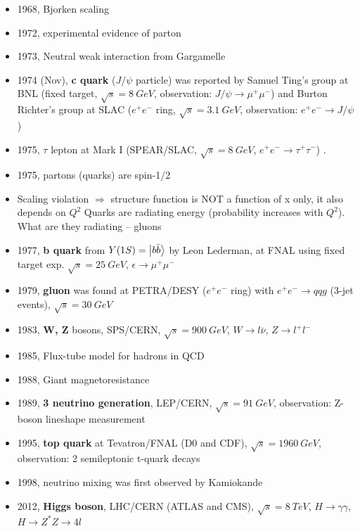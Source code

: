\begin{itemize}
    \item 1968, Bjorken scaling \cite{PhysRev.179.1547}
    \item 1972, experimental evidence of parton \cite{PhysRevD.5.528}
    \item 1973, Neutral weak interaction from Gargamelle \cite{HASERT19741}
    \item 1974 (Nov), \textbf{c quark} ($J/\psi$ particle) was reported by 
	Samuel Ting's group at BNL (fixed target, $\sqrt{s} = 8\ GeV$, 
	observation: $J/\psi \rightarrow \mu^+\mu^-$) 
	and Burton Richter's group at SLAC ($e^+e^-$ ring, $\sqrt{s} = 3.1\ GeV$, 
	observation: $e^+e^- \rightarrow J/\psi$)
    \item 1975, $\tau$ lepton at Mark I (SPEAR/SLAC, $\sqrt{s} = 8 \ GeV$, 
	$e^+e^- \rightarrow \tau^+\tau^-$) \cite{PhysRevLett.35.1489}.
    \item 1975, partons (quarks) are spin-1/2 \cite{PhysRevLett.35.1609}
    \item Scaling violation $\Rightarrow$ structure function is NOT a function 
	of x only, it also depends on $Q^2$
	Quarks are radiating energy (probability increases with $Q^2$). What
	are they radiating -- gluons
    \item 1977, \textbf{b quark} from $Y(1S) = \ket{b\bar{b}}$ by Leon Lederman, 
	at FNAL using fixed target exp.
	$\sqrt{s} = 25 \ GeV$, $\epsilon \rightarrow \mu^+\mu^-$
    \item 1979, \textbf{gluon} was found at PETRA/DESY ($e^+e^-$ ring) with 
	$e^+e^- \rightarrow qqg$ (3-jet events), $\sqrt{s} = 30\ GeV$
    \item 1983, \textbf{W, Z} bosons, SPS/CERN, $\sqrt{s} = 900\ GeV$, $W \rightarrow l\bar{\nu}$,
	$Z \rightarrow l^+l^-$
    \item 1985, Flux-tube model for hadrons in QCD \cite{PhysRevD.31.2910}
    \item 1988, Giant magnetoresistance
    \item 1989, \textbf{3 neutrino generation}, LEP/CERN, $\sqrt{s} = 91\ GeV$, 
	observation: Z-boson lineshape measurement
    \item 1995, \textbf{top quark} at Tevatron/FNAL (D0 and CDF), $\sqrt{s} = 1960\ GeV$, 
	observation: 2 semileptonic t-quark decays
    \item 1998, neutrino mixing was first observed by Kamiokande
    \item 2012, \textbf{Higgs boson}, LHC/CERN (ATLAS and CMS), $\sqrt{s} = 8\ TeV$,
	$H\rightarrow \gamma\gamma$, $H\rightarrow Z^*Z \rightarrow 4l$ \cite{Aad_2012}\cite{201230}
\end{itemize}
